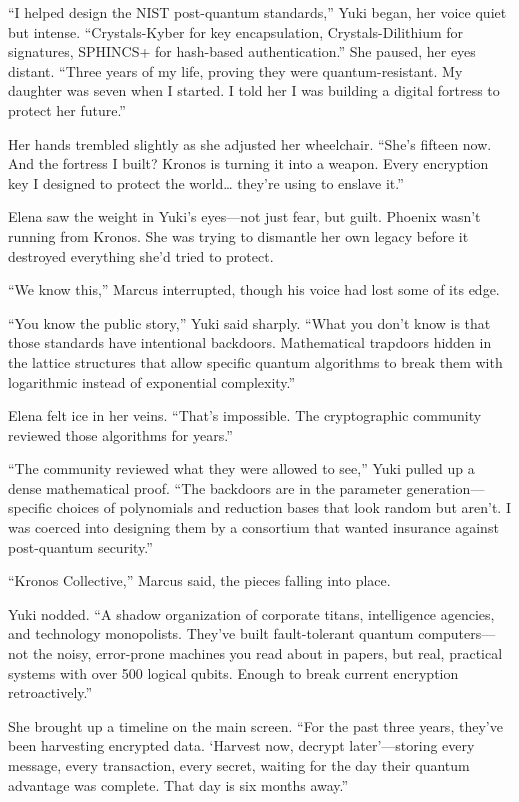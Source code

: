 \documentclass[12pt,letterpaper]{book}
\begin{document}
``I helped design the NIST post-quantum standards,'' Yuki began, her voice quiet but intense. ``Crystals-Kyber for key encapsulation, Crystals-Dilithium for signatures, SPHINCS+ for hash-based authentication.'' She paused, her eyes distant. ``Three years of my life, proving they were quantum-resistant. My daughter was seven when I started. I told her I was building a digital fortress to protect her future.''

Her hands trembled slightly as she adjusted her wheelchair. ``She's fifteen now. And the fortress I built? Kronos is turning it into a weapon. Every encryption key I designed to protect the world\ldots{} they're using to enslave it.''

Elena saw the weight in Yuki's eyes---not just fear, but guilt. Phoenix wasn't running from Kronos. She was trying to dismantle her own legacy before it destroyed everything she'd tried to protect.

``We know this,'' Marcus interrupted, though his voice had lost some of its edge.

``You know the public story,'' Yuki said sharply. ``What you don't know is that those standards have intentional backdoors. Mathematical trapdoors hidden in the lattice structures that allow specific quantum algorithms to break them with logarithmic instead of exponential complexity.''

Elena felt ice in her veins. ``That's impossible. The cryptographic community reviewed those algorithms for years.''

``The community reviewed what they were allowed to see,'' Yuki pulled up a dense mathematical proof. ``The backdoors are in the parameter generation---specific choices of polynomials and reduction bases that look random but aren't. I was coerced into designing them by a consortium that wanted insurance against post-quantum security.''

``Kronos Collective,'' Marcus said, the pieces falling into place.

Yuki nodded. ``A shadow organization of corporate titans, intelligence agencies, and technology monopolists. They've built fault-tolerant quantum computers---not the noisy, error-prone machines you read about in papers, but real, practical systems with over 500 logical qubits. Enough to break current encryption retroactively.''

She brought up a timeline on the main screen. ``For the past three years, they've been harvesting encrypted data. `Harvest now, decrypt later'---storing every message, every transaction, every secret, waiting for the day their quantum advantage was complete. That day is six months away.''
\end{document}
